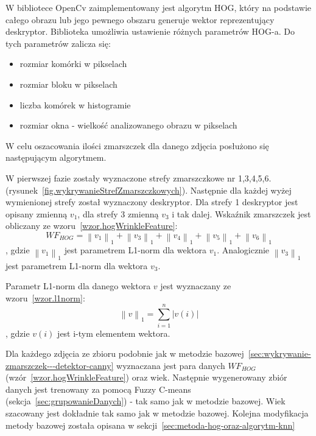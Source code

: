 \documentclass[a4paper,twoside,12pt]{book}
\begin{document}
    W bibliotece OpenCv zaimplementowany jest algorytm HOG, który na podstawie całego
    obrazu lub jego pewnego obszaru generuje wektor reprezentujący deskryptor. Biblioteka umożliwia ustawienie różnych parametrów HOG-a.
    Do tych parametrów zalicza się:
    \begin{itemize}
        \item rozmiar komórki w pikselach
        \item rozmiar bloku w pikselach
        \item liczba komórek w histogramie
        \item rozmiar okna - wielkość analizowanego obrazu w pikselach
    \end{itemize}

    W celu oszacowania ilości zmarszczek dla danego zdjęcia posłużono się następującym algorytmem.

    W pierwszej fazie zostały wyznaczone strefy zmarszczkowe nr 1,3,4,5,6.
    (rysunek~\ref{fig.wykrywanieStrefZmarszczkowych}).
    Następnie dla każdej wyżej wymienionej strefy został wyznaczony deskryptor. Dla strefy 1 deskryptor jest opisany
    zmienną $v_{1}$, dla strefy 3 zmienną $v_{3}$ i tak dalej.
    Wskaźnik zmarszczek jest obliczany ze wzoru~\ref{wzor.hogWrinkleFeature}:
    \large
    \begin{equation}
        WF_{HOG} = \left \|v_{1}  \right \|_{1}+\left \|v_{3}  \right \|_{1}+\left \|v_{4}  \right \|_{1}+\left
        \|v_{5}  \right \|_{1}+\left \|v_{6}  \right \|_{1}
        \label{wzor.hogWrinkleFeature}
    \end{equation}
    \normalsize
    , gdzie $\left \|v_{1}  \right \|_{1}$ jest parametrem L1-norm dla wektora $v_{1}$. Analogicznie $\left \|v_{3}
    \right \|_{1}$  jest parametrem L1-norm dla wektora $v_{3}$.

    Parametr L1-norm dla danego wektora $v$ jest wyznaczany ze wzoru~\ref{wzor.l1norm}:
    \large
    \begin{equation}
        \left \|v  \right \|_{1} = \sum_{i=1}^{n}\left |v(i)  \right |
        \label{wzor.l1norm}
    \end{equation}
    \normalsize
    , gdzie $v(i)$ jest i-tym elementem wektora.

    Dla każdego zdjęcia ze zbioru podobnie jak w metodzie bazowej~\ref{sec:wykrywanie-zmarszczek---detektor-canny}
    wyznaczana jest para danych $WF_{HOG}$ (wzór~\ref{wzor.hogWrinkleFeature}) oraz wiek. Następnie wygenerowany
    zbiór danych jest trenowany za pomocą Fuzzy C-means (sekcja~\ref{sec:grupowanieDanych}) - tak samo jak w metodzie
    bazowej.
    Wiek szacowany jest dokładnie tak samo jak w metodzie bazowej.
    Kolejna modyfikacja metody bazowej została opisana w sekcji~\ref{sec:metoda-hog-oraz-algorytm-knn}
\end{document}

